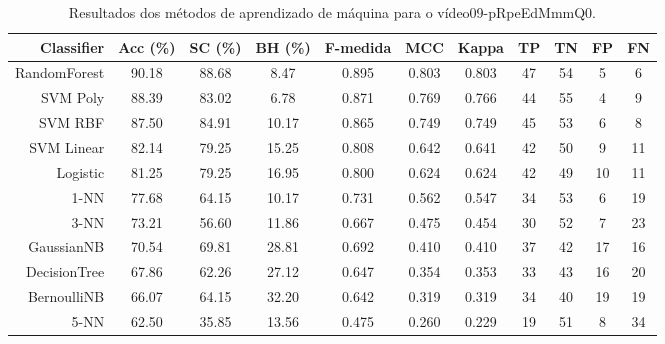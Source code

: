 \begin{table}[!htb]
\centering
\caption{Resultados dos métodos de aprendizado de máquina para o vídeo09-pRpeEdMmmQ0.}
\label{tab:09-pRpeEdMmmQ0}
\begin{tabular}{r|c|c|c|c|c|c|c|c|c|c}
\hline\hline
Classifier & Acc (\%) & SC (\%) & BH (\%) & F-medida & MCC & Kappa & TP & TN & FP & FN \\ \hline
RandomForest & 90.18 & 88.68 & 8.47 & 0.895 & 0.803 & 0.803 & 47 & 54 & 5 & 6 \\ 
SVM Poly & 88.39 & 83.02 & 6.78 & 0.871 & 0.769 & 0.766 & 44 & 55 & 4 & 9 \\ 
SVM RBF & 87.50 & 84.91 & 10.17 & 0.865 & 0.749 & 0.749 & 45 & 53 & 6 & 8 \\ 
SVM Linear & 82.14 & 79.25 & 15.25 & 0.808 & 0.642 & 0.641 & 42 & 50 & 9 & 11 \\ 
Logistic & 81.25 & 79.25 & 16.95 & 0.800 & 0.624 & 0.624 & 42 & 49 & 10 & 11 \\ 
1-NN & 77.68 & 64.15 & 10.17 & 0.731 & 0.562 & 0.547 & 34 & 53 & 6 & 19 \\ 
3-NN & 73.21 & 56.60 & 11.86 & 0.667 & 0.475 & 0.454 & 30 & 52 & 7 & 23 \\ 
GaussianNB & 70.54 & 69.81 & 28.81 & 0.692 & 0.410 & 0.410 & 37 & 42 & 17 & 16 \\ 
DecisionTree & 67.86 & 62.26 & 27.12 & 0.647 & 0.354 & 0.353 & 33 & 43 & 16 & 20 \\ 
BernoulliNB & 66.07 & 64.15 & 32.20 & 0.642 & 0.319 & 0.319 & 34 & 40 & 19 & 19 \\ 
5-NN & 62.50 & 35.85 & 13.56 & 0.475 & 0.260 & 0.229 & 19 & 51 & 8 & 34 \\ 
\hline\hline
\end{tabular}
\end{table}
